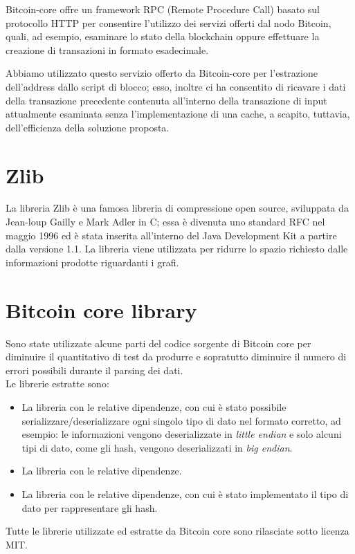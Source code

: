 Bitcoin-core offre un framework RPC (Remote Procedure Call) basato sul protocollo HTTP per consentire l'utilizzo dei servizi offerti dal nodo Bitcoin, quali, ad esempio,  esaminare lo stato della blockchain oppure effettuare la creazione di transazioni in formato esadecimale.

Abbiamo utilizzato questo servizio offerto da Bitcoin-core per l'estrazione dell'address dallo script di blocco; esso, inoltre ci ha consentito di ricavare i dati della transazione precedente contenuta all'interno della transazione di input attualmente esaminata senza l'implementazione di una cache, a scapito, tuttavia, dell'efficienza della soluzione proposta.

\section{Zlib} \label{sec:zlib}

La libreria Zlib \cite{zlib:github} è una famosa libreria di compressione open source, sviluppata da Jean-loup Gailly e Mark Adler in C; essa è divenuta  uno standard RFC nel maggio 1996 ed è stata inserita all'interno del Java Development Kit a partire dalla versione 1.1.
La libreria viene utilizzata per ridurre lo spazio richiesto dalle informazioni prodotte riguardanti i grafi.

\section{Bitcoin core library} \label{sec:bitcoinCoreLib}

Sono state utilizzate alcune parti del codice sorgente di Bitcoin core per diminuire il quantitativo di test da produrre e sopratutto diminuire il numero di errori possibili durante il parsing dei dati.\\
Le librerie estratte sono:
\begin{itemize}
  \item La libreria  con le relative dipendenze, con cui è stato possibile serializzare/deserializzare ogni singolo tipo di dato nel formato corretto, ad esempio: le informazioni vengono deserializzate in \emph{little endian} e solo alcuni tipi di dato, come gli hash, vengono deserializzati in \emph{big endian}.
  \item La libreria  con le relative dipendenze.
  \item La libreria  con le relative dipendenze, con cui è stato implementato il tipo di dato per rappresentare gli hash.
\end{itemize}
Tutte le librerie utilizzate ed estratte da Bitcoin core sono rilasciate sotto licenza MIT.


